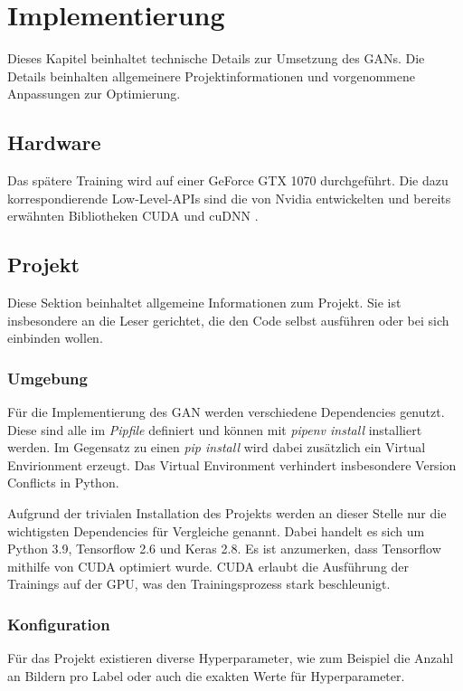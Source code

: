 
\chapter{Implementierung}
Dieses Kapitel beinhaltet technische Details zur Umsetzung des GANs.
Die Details beinhalten allgemeinere Projektinformationen und vorgenommene Anpassungen zur Optimierung.

\section{Hardware}
Das spätere Training wird auf einer GeForce GTX 1070 \cite{gtx-1070} durchgeführt.
Die dazu korrespondierende Low-Level-APIs sind die von Nvidia entwickelten und bereits erwähnten Bibliotheken CUDA \cite{cuda-doc} und cuDNN \cite{cudnn-doc}.  

\section{Projekt}
Diese Sektion beinhaltet allgemeine Informationen zum Projekt.
Sie ist insbesondere an die Leser gerichtet, die den Code selbst ausführen oder bei sich einbinden wollen.

\subsection{Umgebung}
Für die Implementierung des GAN werden verschiedene Dependencies genutzt.
Diese sind alle im \textit{Pipfile} definiert und können mit \textit{pipenv install} installiert werden.
Im Gegensatz zu einen \textit{pip install} wird dabei zusätzlich ein Virtual Envirionment erzeugt.
Das Virtual Environment verhindert insbesondere Version Conflicts in Python.
\newline

Aufgrund der trivialen Installation des Projekts werden an dieser Stelle nur die wichtigsten Dependencies für Vergleiche genannt.
Dabei handelt es sich um Python 3.9, Tensorflow 2.6 und Keras 2.8.
Es ist anzumerken, dass Tensorflow mithilfe von CUDA optimiert wurde.
CUDA erlaubt die Ausführung der Trainings auf der GPU, was den Trainingsprozess stark beschleunigt.

\subsection{Konfiguration}
\label{chapter:configuration-hyperparams}
Für das Projekt existieren diverse Hyperparameter, wie zum Beispiel die Anzahl an Bildern pro Label oder auch die exakten Werte für Hyperparameter.
\newline

